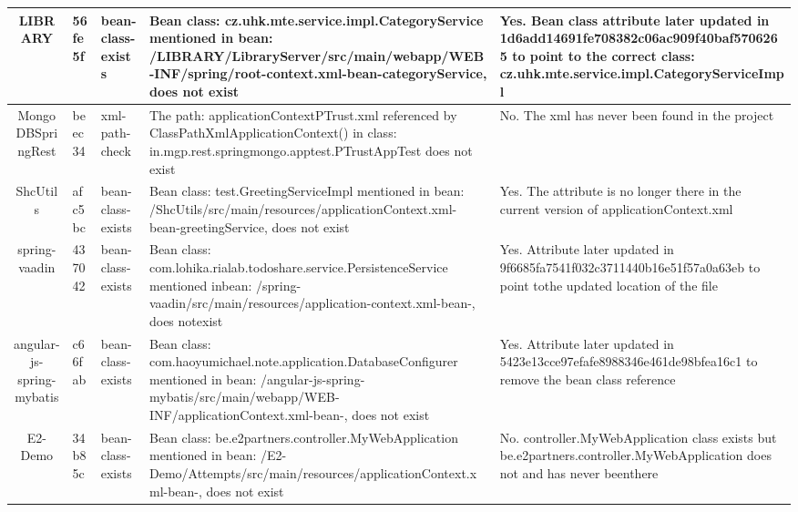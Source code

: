 \begin{longtable}{|c|l|l|p{6cm}|p{3cm}|}
\hline
LIBRARY & 56fe5f & bean-class-exists & Bean class: cz.uhk.mte.service.impl.Cat\allowbreak egoryService mentioned in bean: /LIBRARY\allowbreak /LibraryServer/src/main/webapp/WEB-INF/s\allowbreak pring/root-context.xml-bean-categoryServ\allowbreak ice, does not exist & Yes. Bean class \allowbreak attribute later u\allowbreak pdated in 1d6add1\allowbreak 4691fe708382c06ac\allowbreak 909f40baf5706265 \allowbreak to point to the c\allowbreak orrect class: cz.\allowbreak uhk.mte.service.i\allowbreak mpl.CategoryServi\allowbreak ceImpl \\
\hline
MongoDBSpringRest & beec34 & xml-path-check & The path: applicationContextPTrust.xml \allowbreak referenced by ClassPathXmlApplicationCon\allowbreak text() in class: in.mgp.rest.springmongo\allowbreak .apptest.PTrustAppTest does not exist & No. The xml has \allowbreak never been found \allowbreak in the project \\
\hline
ShcUtils & afc5bc & bean-class-exists & Bean class: test.GreetingServiceImpl me\allowbreak ntioned in bean: /ShcUtils/src/main/reso\allowbreak urces/applicationContext.xml-bean-greeti\allowbreak ngService, does not exist & Yes. The attribu\allowbreak te is no longer t\allowbreak here in the curre\allowbreak nt version of app\allowbreak licationContext.x\allowbreak ml \\
\hline
spring-vaadin & 437042 & bean-class-exists & Bean class: com.lohika.rialab.todoshare\allowbreak .service.PersistenceService mentioned in\allowbreak  bean: /spring-vaadin/src/main/resources\allowbreak /application-context.xml-bean-, does not\allowbreak  exist & Yes. Attribute l\allowbreak ater updated in 9\allowbreak f6685fa7541f032c3\allowbreak 711440b16e51f57a0\allowbreak a63eb to point to\allowbreak  the updated loca\allowbreak tion of the file \\
\hline
angular-js-spring-mybatis & c66fab & bean-class-exists & Bean class: com.haoyumichael.note.appli\allowbreak cation.DatabaseConfigurer mentioned in b\allowbreak ean: /angular-js-spring-mybatis/src/main\allowbreak /webapp/WEB-INF/applicationContext.xml-b\allowbreak ean-, does not exist & Yes. Attribute l\allowbreak ater updated in 5\allowbreak 423e13cce97efafe8\allowbreak 988346e461de98bfe\allowbreak a16c1 to remove t\allowbreak he bean class ref\allowbreak erence \\
\hline
E2-Demo & 34b85c & bean-class-exists & Bean class: be.e2partners.controller.My\allowbreak WebApplication mentioned in bean: /E2-De\allowbreak mo/Attempts/src/main/resources/applicati\allowbreak onContext.xml-bean-, does not exist & No. controller.M\allowbreak yWebApplication c\allowbreak lass exists but b\allowbreak e.e2partners.cont\allowbreak roller.MyWebAppli\allowbreak cation does not a\allowbreak nd has never been\allowbreak  there \\
\hline
\end{longtable}\label{tab:real-bugs}
\clearpage
\twocolumn